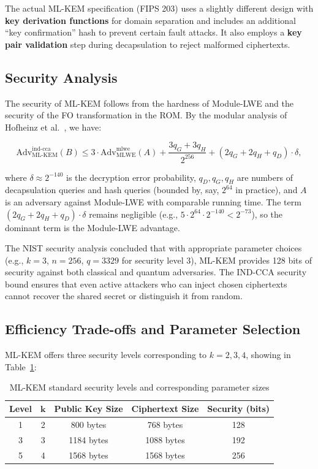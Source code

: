 The actual ML-KEM specification (FIPS 203) uses a slightly different design with \textbf{key derivation functions} for domain separation and includes an additional ``key confirmation'' hash to prevent certain fault attacks. It also employs a \textbf{key pair validation} step during decapsulation to reject malformed ciphertexts.

\subsection{Security Analysis}

The security of ML-KEM follows from the hardness of Module-LWE and the security of the FO transformation in the ROM. By the modular analysis of Hofheinz et al.~\cite{hofheinz2017modular}, we have:

$$
\text{Adv}_{\text{ML-KEM}}^{\text{ind-cca}}(B) \le 3 \cdot \text{Adv}_{\text{MLWE}}^{\text{mlwe}}(A) + \frac{3q_G + 3q_H}{2^{256}} + (2q_G + 2q_H + q_D) \cdot \delta,
$$

where $\delta \approx 2^{-140}$ is the decryption error probability, $q_D,q_G, q_H$ are numbers of decapsulation queries and hash queries (bounded by, say, $2^{64}$ in practice), and $A$ is an adversary against Module-LWE with comparable running time. The term $(2q_G + 2q_H + q_D) \cdot \delta$ remains negligible (e.g., $5 \cdot 2^{64} \cdot 2^{-140} < 2^{-73}$), so the dominant term is the Module-LWE advantage.

The NIST security analysis concluded that with appropriate parameter choices (e.g., $k=3$, $n=256$, $q=3329$ for security level 3), ML-KEM provides 128 bits of security against both classical and quantum adversaries. The IND-CCA security bound ensures that even active attackers who can inject chosen ciphertexts cannot recover the shared secret or distinguish it from random.

\subsection{Efficiency Trade-offs and Parameter Selection}

ML-KEM offers three security levels corresponding to $k = 2, 3, 4$, showing in Table~\ref{tab:ml-kem-security-levels}:

\begin{table}[htbp]
    \centering
    \caption{ML-KEM standard security levels and corresponding parameter sizes}
    \label{tab:ml-kem-security-levels}
    \begin{tabular}{c c c c c}
        \hline
        \textbf{Level} & $\boldsymbol{k}$ & \textbf{Public Key Size} & \textbf{Ciphertext Size} & \textbf{Security (bits)} \\
        \hline
        1 & 2 & 800 bytes  & 768 bytes  & 128 \\
        \hline
        3 & 3 & 1184 bytes & 1088 bytes & 192 \\
        \hline
        5 & 4 & 1568 bytes & 1568 bytes & 256 \\
        \hline
    \end{tabular}
\end{table}

